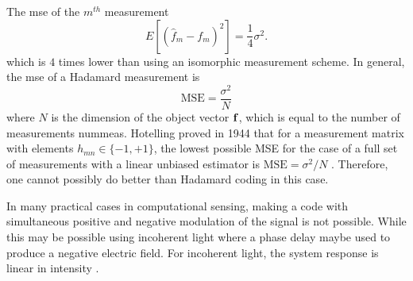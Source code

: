 The \gls{mse} of the $m^{th}$ measurement  
\begin{equation}
	E [ ( \hat{f}_{m} - {f}_{m} )^2 ] = \frac{1}{4} \sigma^2.
\end{equation}
which is $4$ times lower than using an isomorphic measurement scheme. In general, the \gls{mse} of a Hadamard measurement is 
\begin{equation}
	\text{MSE} = \frac{\sigma^2}{N}
	\label{eq:hadamardmse}
\end{equation}
where $N$ is the dimension of the object vector $\displaystyle \mathbf{f}$, which is equal to the number of measurements \gls{nummeas}. Hotelling proved in 1944 that for a measurement matrix with elements $h_{mn} \in \{-1, +1\}$, the lowest possible MSE for the case of a full set of measurements with a linear unbiased estimator is $\text{MSE} = {\sigma^2} / {N}$ \cite{brady2009optical}. Therefore, one cannot possibly do better than Hadamard coding in this case. 

In many practical cases in computational sensing, making a code with simultaneous positive and negative modulation of the signal is not possible. While this may be possible using incoherent light where a phase delay maybe used to produce a negative electric field. For incoherent light, the system response is linear in intensity \cite{goodman2005introduction}. 

